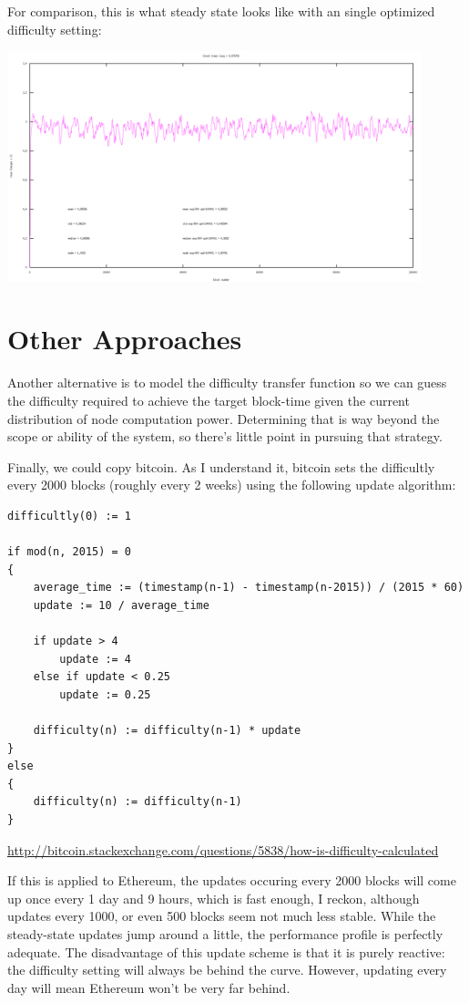 \documentclass[10pt,a4paper]{article}
\begin{document}
\newpage

For comparison, this is what steady state looks like with an single optimized difficulty setting:
\begin{center}
\includegraphics[width=12cm]{Diagrams/SimulationGraphs/simulation_avg-500_upd-none.png}
\end{center}

\section*{Other Approaches}
	Another alternative is to model the difficulty transfer function so we can guess the difficulty required to achieve the target block-time given the current distribution of node computation power. Determining that is way beyond the scope or ability of the system, so there's little point in pursuing that strategy. 
	
	Finally, we could copy bitcoin. As I understand it, bitcoin sets the difficultly every 2000 blocks (roughly every 2 weeks) using the following update algorithm:
	
\begin{verbatim}
difficultly(0) := 1

if mod(n, 2015) = 0
{
    average_time := (timestamp(n-1) - timestamp(n-2015)) / (2015 * 60)
    update := 10 / average_time
	
    if update > 4
        update := 4
    else if update < 0.25
        update := 0.25
        
    difficulty(n) := difficulty(n-1) * update 
}
else
{
    difficulty(n) := difficulty(n-1)
}
\end{verbatim}

\url{http://bitcoin.stackexchange.com/questions/5838/how-is-difficulty-calculated}

\newpage

If this is applied to Ethereum, the updates occuring every 2000 blocks will come up once every 1 day and 9 hours, which is fast enough, I reckon, although updates every 1000, or even 500 blocks seem not much less stable. While the steady-state updates jump around a little, the performance profile is perfectly adequate. The disadvantage of this update scheme is that it is purely reactive: the difficulty setting will always be behind the curve. However, updating every day will mean Ethereum won't be very far behind.
\end{document}
